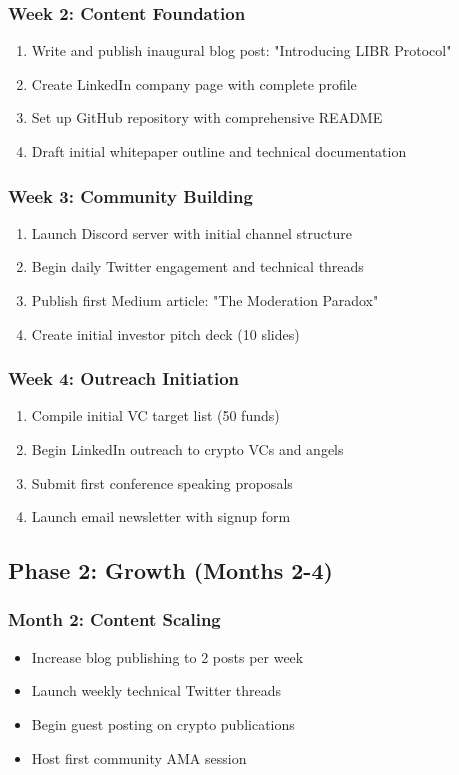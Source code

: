 \documentclass[12pt,a4paper]{article}
\begin{document}
\subsubsection{Week 2: Content Foundation}
\begin{enumerate}
    \item Write and publish inaugural blog post: "Introducing LIBR Protocol"
    \item Create LinkedIn company page with complete profile
    \item Set up GitHub repository with comprehensive README
    \item Draft initial whitepaper outline and technical documentation
\end{enumerate}

\subsubsection{Week 3: Community Building}
\begin{enumerate}
    \item Launch Discord server with initial channel structure  
    \item Begin daily Twitter engagement and technical threads
    \item Publish first Medium article: "The Moderation Paradox"
    \item Create initial investor pitch deck (10 slides)
\end{enumerate}

\subsubsection{Week 4: Outreach Initiation}
\begin{enumerate}
    \item Compile initial VC target list (50 funds)
    \item Begin LinkedIn outreach to crypto VCs and angels
    \item Submit first conference speaking proposals
    \item Launch email newsletter with signup form
\end{enumerate}

\subsection{Phase 2: Growth (Months 2-4)}

\subsubsection{Month 2: Content Scaling}
\begin{itemize}
    \item Increase blog publishing to 2 posts per week
    \item Launch weekly technical Twitter threads
    \item Begin guest posting on crypto publications
    \item Host first community AMA session
\end{itemize}
\end{document}
